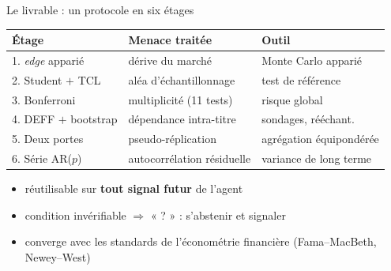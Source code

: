 \documentclass[10pt]{beamer}
\newcommand{\edge}{\textit{edge}}
\begin{document}
\begin{frame}{Le livrable : un protocole en six étages}
  \begin{center}
  \small
  \begin{tabular}{@{}lll@{}}
    \toprule
    Étage & Menace traitée & Outil \\
    \midrule
    1. \edge{} apparié & dérive du marché & Monte Carlo apparié \\
    2. Student $+$ TCL & aléa d'échantillonnage & test de référence \\
    3. Bonferroni & multiplicité (11 tests) & risque global \\
    4. DEFF $+$ bootstrap & dépendance intra-titre & sondages, rééchant. \\
    5. Deux portes & pseudo-réplication & agrégation équipondérée \\
    6. Série AR($p$) & autocorrélation résiduelle & variance de long terme \\
    \bottomrule
  \end{tabular}
  \end{center}
  \vspace{5mm}
  \begin{itemize}\setlength{\itemsep}{3mm}
    \item réutilisable sur \textbf{tout signal futur} de l'agent
    \item condition invérifiable $\Rightarrow$ « ? » : s'abstenir et signaler
    \item converge avec les standards de l'économétrie financière
      {\footnotesize (Fama--MacBeth, Newey--West)}
  \end{itemize}
\end{frame}
\end{document}
